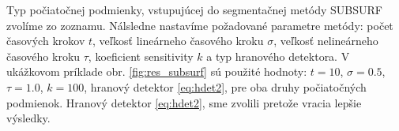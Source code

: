 \documentclass[a4paper,11pt,oneside]{article}%
\begin{document}
Typ počiatočnej podmienky, vstupujúcej do segmentačnej metódy SUBSURF zvolíme zo zoznamu. Nálsledne nastavíme požadované parametre metódy: počet časových krokov $t$, veľkosť lineárneho časového kroku $\sigma$, veľkosť nelineárneho časového kroku $\tau$, koeficient sensitivity $k$ a typ hranového detektora. V ukážkovom príklade obr. \ref{fig:res_subsurf} sú použité hodnoty: $t = 10$, $\sigma = 0.5$, $\tau = 1.0$, $k = 100$, hranový detektor \ref{eq:hdet2}, pre oba druhy počiatočných podmienok. Hranový detektor \ref{eq:hdet2}, sme zvolili pretože vracia lepšie výsledky.

\begin{figure}[H]%
    \centering
    \qquad

\end{figure}
\end{document}

